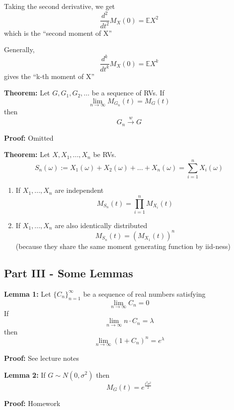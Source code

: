 \documentclass[12pt]{article}
\newcommand{\E}{\mathbb{E}}
\begin{document}
Taking the second derivative, we get 
\[\frac{d^2}{dt^2}M_X(0) = \E X^2\]
which is the ``second moment of X''

Generally, 
\[\frac{d^k}{dt^k} M_X(0) = \E X^k\]
gives the ``k-th moment of X''

\textbf{Theorem:} Let $G, G_1, G_2, ...$ be a sequence of RVs. If 
\[\lim_{n \to \infty} M_{G_n}(t) = M_G(t)\]
then 
\[G_n \overset{w}{\to} G\]

\textbf{Proof:} Omitted

\textbf{Theorem:} Let $X, X_1, ..., X_n$ be RVs. 
\[S_n(\omega) := X_1(\omega) + X_2(\omega) + ... + X_n(\omega) = \sum_{i=1}^n X_i(\omega)\]
\begin{enumerate}
    \item If $X_1, ..., X_n$ are independent 
    \[M_{S_n}(t) = \prod_{i=1}^n M_{X_i}(t)\]

    \item If $X_1, ..., X_n$ are also identically distributed
    \[M_{S_n}(t) = \left(M_{X_1}(t)\right)^n\]
    (because they share the same moment generating function by iid-ness)
\end{enumerate}

\subsection*{Part III - Some Lemmas}
\textbf{Lemma 1:} Let $\{C_n\}_{n=1}^\infty$ be a sequence of real numbers satisfying 
\[\lim_{n \to \infty} C_n = 0\]
If 
\[\lim_{n \to \infty} n \cdot C_n = \lambda\]
then 
\[\lim_{n \to \infty} (1 + C_n)^n = e^\lambda\]

\textbf{Proof:} See lecture notes

\textbf{Lemma 2:} If $G \sim N(0, \sigma^2)$ then 
\[M_G(t) = e^{\frac{t^2\sigma^2}{2}}\]

\textbf{Proof:} Homework
\end{document}
